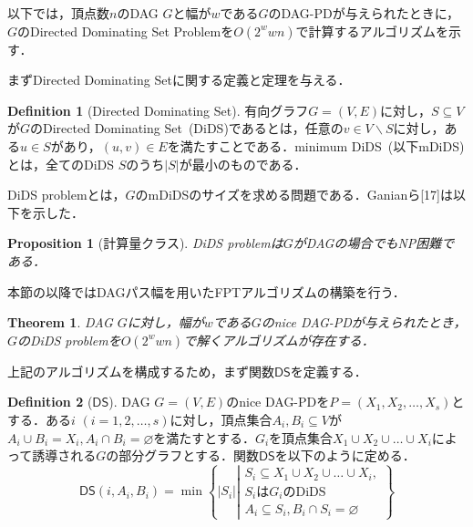 \documentclass[master]{kuisthesis}		%
\theoremstyle{plain}
\newtheorem{theorem}{Theorem}
\newtheorem{proposition}{Proposition}
\theoremstyle{definition}
\newtheorem{definition*}{Definition}
\begin{document}
以下では，頂点数$n$のDAG $G$と幅が$w$である$G$のDAG-PDが与えられたときに，$G$のDirected Dominating Set Problemを$O(2^wwn)$で計算するアルゴリズムを示す．


まずDirected Dominating Setに関する定義と定理を与える．

\begin{definition*}[Directed Dominating Set]
    有向グラフ$G=(V, E)$に対し，$S \subseteq V$が$G$のDirected Dominating Set\ (DiDS)であるとは，任意の$v \in V\backslash S$に対し，ある$u \in S$があり，$(u, v) \in E$を満たすことである．minimum DiDS\ (以下mDiDS)とは，全てのDiDS $S$のうち$|S|$が最小のものである．
\end{definition*}

DiDS problemとは，$G$のmDiDSのサイズを求める問題である．Ganianら[17]は以下を示した．


\begin{proposition}[計算量クラス]
    DiDS problemは$G$がDAGの場合でもNP困難である．
\end{proposition}

本節の以降ではDAGパス幅を用いたFPTアルゴリズムの構築を行う．

\begin{theorem}
    DAG $G$に対し，幅が$w$である$G$のnice DAG-PDが与えられたとき，$G$のDiDS problemを$O(2^wwn)$で解くアルゴリズムが存在する．
\end{theorem}

上記のアルゴリズムを構成するため，まず関数$\mathsf{DS}$を定義する．

\begin{definition*}[$\mathsf{DS}$]
    DAG $G=(V, E)$のnice DAG-PDを$P=(X_1, X_2, \dots , X_s)$とする．ある$i$ $(i=1, 2, \dots , s)$に対し，頂点集合$A_i, B_i \subseteq V$が$A_i \cup B_i = X_i, A_i \cap B_i = \varnothing$を満たすとする．$G_i$を頂点集合$X_1 \cup X_2 \cup \dots \cup X_i$によって誘導される$G$の部分グラフとする．関数$\mathsf{DS}$を以下のように定める．
    \begin{equation}\label{def_ds}
        \mathsf{DS}(i, A_i, B_i) = \min \left\{ |S_i| \left |
        \begin{array}{l}
            S_i \subseteq X_1 \cup X_2 \cup  \dots \cup X_i, \\
            S_i \text{は} G_i \text{のDiDS} \\
            A_i \subseteq S_i, B_i \cap S_i = \varnothing
        \end{array}
        \right. \right\}
    \end{equation}
\end{definition*}
\end{document}
